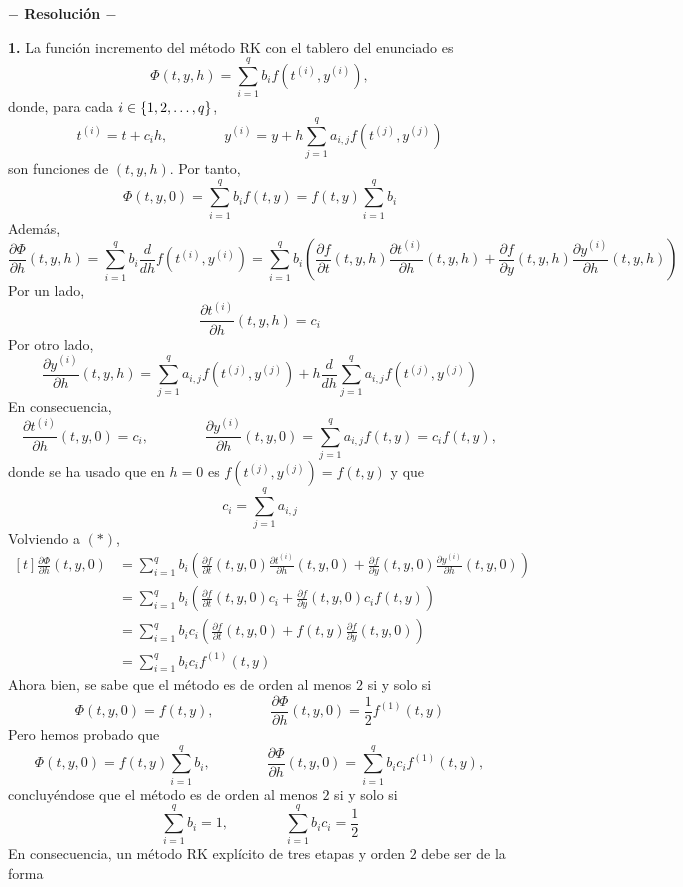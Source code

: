 \documentclass[11pt]{report}
\begin{document}




\begin{center}

	\textbf{$-$ Resolución $-$}

\end{center}


\textbf{1.} La función incremento del método RK con el tablero del enunciado es 
\[\Phi(t,y,h) = \sum_{i=1}^q b_if(t^{(i)}, y^{(i)}),\]
donde, para cada $i \in \{1,2,\mathellipsis,q\}$,
\[t^{(i)} = t + c_ih, \qquad \qquad y^{(i)} = y+h\sum_{j=1}^q a_{i,j}f(t^{(j)},y^{(j)})\]
son funciones de $(t,y,h)$. Por tanto,
\[\Phi(t,y,0) = \sum_{i=1}^qb_if(t,y) = f(t,y)\sum_{i=1}^q b_i\]
Además,
\[
    \frac{\partial \Phi}{\partial h}(t,y,h) = \sum_{i=1}^qb_i \frac{d}{dh}f(t^{(i)},y^{(i)}) = \sum_{i=1}^qb_i \left(\frac{\partial f}{\partial t}(t,y,h)\frac{\partial t^{(i)}}{\partial h}(t,y,h)+\frac{\partial f}{\partial y}(t,y,h)\frac{\partial y^{(i)}}{\partial h}(t,y,h)\right) \tag{$\ast$}
\]
Por un lado,
\[\frac{\partial t^{(i)}}{\partial h}(t,y,h) = c_i\]
Por otro lado,
\[\frac{\partial y^{(i)}}{\partial h}(t,y,h) = \sum_{j=1}^qa_{i,j}f(t^{(j)},y^{(j)}) + h \frac{d}{dh}\sum_{j=1}^q a_{i,j}f(t^{(j)},y^{(j)})\]
En consecuencia,
\[\frac{\partial t^{(i)}}{\partial h}(t,y,0) = c_i, \qquad \qquad \frac{\partial y^{(i)}}{\partial h}(t,y,0) =\sum_{j=1}^qa_{i,j}f(t,y) = c_if(t,y),\]
donde se ha usado que en $h=0$ es $f(t^{(j)},y^{(j)}) = f(t,y)$ y que
\[c_i = \sum_{j=1}^q a_{i,j}\]
Volviendo a $(\ast)$,
\[\begin{aligned}[t]\frac{\partial \Phi}{\partial h}(t,y,0) &= \sum_{i=1}^qb_i \left(\frac{\partial f}{\partial t}(t,y,0)\frac{\partial t^{(i)}}{\partial h}(t,y,0)+\frac{\partial f}{\partial y}(t,y,0)\frac{\partial y^{(i)}}{\partial h}(t,y,0)\right) \\
    &=  \sum_{i=1}^qb_i \left(\frac{\partial f}{\partial t}(t,y,0)c_i+\frac{\partial f}{\partial y}(t,y,0)c_if(t,y)\right) \\
    &= \sum_{i=1}^q b_ic_i \left(\frac{\partial f}{\partial t}(t,y,0)+f(t,y)\frac{\partial f}{\partial y}(t,y,0)\right) \\
    &=\sum_{i=1}^q b_ic_i f^{(1)}(t,y)
\end{aligned}\]
Ahora bien, se sabe que el método es de orden al menos $2$ si y solo si
\[\Phi(t,y,0) = f(t,y), \qquad \qquad \frac{\partial \Phi}{\partial h}(t,y,0) = \frac{1}{2}f^{(1)}(t,y)\]
Pero hemos probado que
\[\Phi(t,y,0) = f(t,y) \sum_{i=1}^q b_i, \qquad \qquad \frac{\partial \Phi}{\partial h}(t,y,0) = \sum_{i=1}^q b_ic_i f^{(1)}(t,y),\]
concluyéndose que el método es de orden al menos $2$ si y solo si 
\[\sum_{i=1}^qb_i = 1, \qquad \qquad \sum_{i=1}^q b_ic_i = \frac{1}{2}\]
En consecuencia, un método RK explícito de tres etapas y orden $2$ debe ser de la forma
\end{document}
